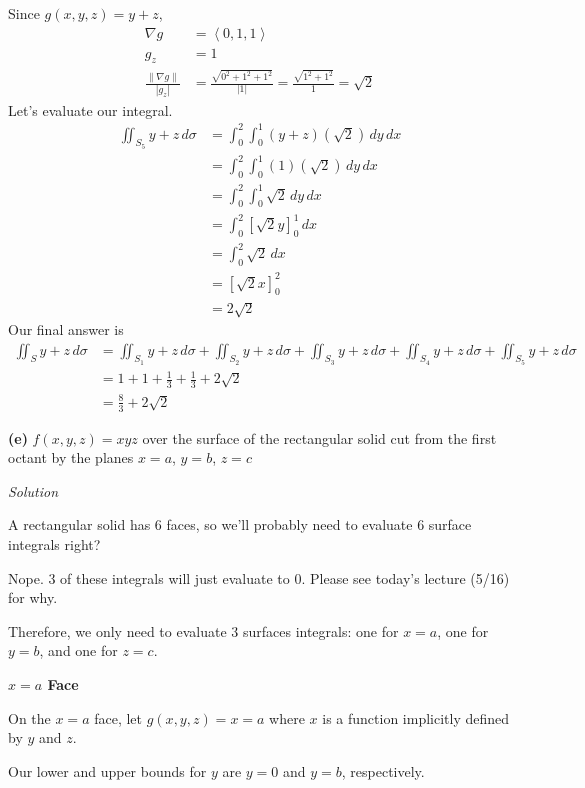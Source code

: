 \documentclass{article}
\newcommand{\lrp}[1]{\left( #1 \right)}
\newcommand{\lra}[1]{\left\langle #1 \right\rangle}
\newcommand{\lrb}[1]{\left[ #1 \right]}
\newcommand{\norm}[1]{\left\lVert #1 \right\rVert}
\newcommand{\Solution}{\textit{Solution}}
\begin{document}
Since $g(x,y,z)=y+z$,
\begin{align*}
    \nabla g &= \lra{0,1,1}\\
    g_z &=1\\
    \frac{\norm{\nabla g}}{\left|g_z\right|}&=\frac{\sqrt{0^2+1^2+1^2}}{\left|1\right|}=\frac{\sqrt{1^2+1^2}}{1}=\sqrt{2}
\end{align*}
Let's evaluate our integral.
\begin{align*}
    \iint_{S_5} y+z\,d\sigma &=\int_0^2\int_0^1\lrp{y+z}\lrp{\sqrt{2}}\,dy\,dx\\
    &=\int_0^2\int_0^1\lrp{1}\lrp{\sqrt{2}}\,dy\,dx\tag{$y+z=1$}\\
    &=\int_0^2\int_0^1\sqrt{2}\,dy\,dx\\
    &=\int_0^2 \lrb{\sqrt{2}y}_0^1\,dx\\
    &=\int_0^2 \sqrt{2}\,dx\\
    &=\lrb{\sqrt{2}x}_0^2\\
    &=2\sqrt{2}
\end{align*}
Our final answer is
\begin{align*}
   \iint_S y+z\,d\sigma&=\iint_{S_1} y+z\,d\sigma+\iint_{S_2} y+z\,d\sigma+\iint_{S_3} y+z\,d\sigma+\iint_{S_4} y+z\,d\sigma+\iint_{S_5} y+z\,d\sigma\\ &=1+1+\frac{1}{3}+\frac{1}{3}+2\sqrt{2}\\
   &=\boxed{\frac{8}{3}+2\sqrt{2}}
\end{align*}

{}\textbf{(e)} $f(x,y,z)=xyz$ over the surface of the rectangular solid cut from the first octant by the planes $x=a$, $y=b$, $z=c$

\Solution

A rectangular solid has $6$ faces, so we'll probably need to evaluate $6$ surface integrals right?

Nope. $3$ of these integrals will just evaluate to $0$. Please see today's lecture (5/16) for why.

Therefore, we only need to evaluate $3$ surfaces integrals: one for $x=a$, one for $y=b$, and one for $z=c$.

{}\textbf{$x=a$ Face}

On the $x=a$ face, let $g(x,y,z)=x=a$ where $x$ is a function implicitly defined by $y$ and $z$.

Our lower and upper bounds for $y$ are $y=0$ and $y=b$, respectively.
\end{document}
